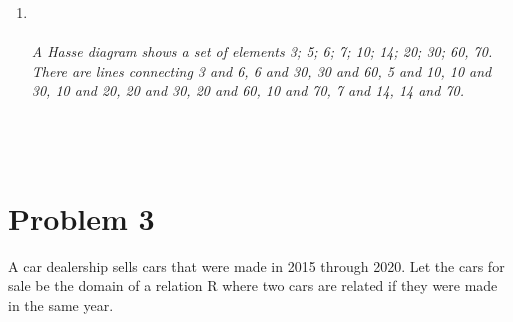 \begin{enumerate}[label=(\alph*)]
{{}
}
\\
\\
\\\\
\newpage
\item
{}
\\\\
{\color{blue}{\bf Figure 5:} \emph{A Hasse diagram shows a set of elements {3; 5; 6; 7; 10; 14; 20; 30; 60, 70}. There are lines connecting 3 and 6, 6 and 30, 30 and 60, 5 and 10, 10 and 30, 10 and 20, 20 and 30, 20 and 60, 10 and 70, 7 and 14, 14 and 70.
}
}
\\\\
\\\\

\end{enumerate}
  \newpage
  \section*{Problem 3}
  A car dealership sells cars that were made in 2015 through 2020. Let the cars for sale be the domain of a relation R where two cars are related if they were made in the same year.

